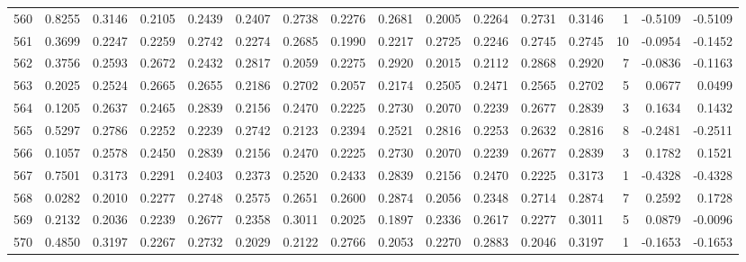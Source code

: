 \begin{tabular}{lrrrrrrrrrrrrrrr}
560 &      0.8255 &  0.3146 &  0.2105 &  0.2439 &  0.2407 &  0.2738 &  0.2276 &  0.2681 &  0.2005 &  0.2264 &   0.2731 &     0.3146 &      1 &                   -0.5109 &                    -0.5109 \\
561 &      0.3699 &  0.2247 &  0.2259 &  0.2742 &  0.2274 &  0.2685 &  0.1990 &  0.2217 &  0.2725 &  0.2246 &   0.2745 &     0.2745 &     10 &                   -0.0954 &                    -0.1452 \\
562 &      0.3756 &  0.2593 &  0.2672 &  0.2432 &  0.2817 &  0.2059 &  0.2275 &  0.2920 &  0.2015 &  0.2112 &   0.2868 &     0.2920 &      7 &                   -0.0836 &                    -0.1163 \\
563 &      0.2025 &  0.2524 &  0.2665 &  0.2655 &  0.2186 &  0.2702 &  0.2057 &  0.2174 &  0.2505 &  0.2471 &   0.2565 &     0.2702 &      5 &                    0.0677 &                     0.0499 \\
564 &      0.1205 &  0.2637 &  0.2465 &  0.2839 &  0.2156 &  0.2470 &  0.2225 &  0.2730 &  0.2070 &  0.2239 &   0.2677 &     0.2839 &      3 &                    0.1634 &                     0.1432 \\
565 &      0.5297 &  0.2786 &  0.2252 &  0.2239 &  0.2742 &  0.2123 &  0.2394 &  0.2521 &  0.2816 &  0.2253 &   0.2632 &     0.2816 &      8 &                   -0.2481 &                    -0.2511 \\
566 &      0.1057 &  0.2578 &  0.2450 &  0.2839 &  0.2156 &  0.2470 &  0.2225 &  0.2730 &  0.2070 &  0.2239 &   0.2677 &     0.2839 &      3 &                    0.1782 &                     0.1521 \\
567 &      0.7501 &  0.3173 &  0.2291 &  0.2403 &  0.2373 &  0.2520 &  0.2433 &  0.2839 &  0.2156 &  0.2470 &   0.2225 &     0.3173 &      1 &                   -0.4328 &                    -0.4328 \\
568 &      0.0282 &  0.2010 &  0.2277 &  0.2748 &  0.2575 &  0.2651 &  0.2600 &  0.2874 &  0.2056 &  0.2348 &   0.2714 &     0.2874 &      7 &                    0.2592 &                     0.1728 \\
569 &      0.2132 &  0.2036 &  0.2239 &  0.2677 &  0.2358 &  0.3011 &  0.2025 &  0.1897 &  0.2336 &  0.2617 &   0.2277 &     0.3011 &      5 &                    0.0879 &                    -0.0096 \\
570 &      0.4850 &  0.3197 &  0.2267 &  0.2732 &  0.2029 &  0.2122 &  0.2766 &  0.2053 &  0.2270 &  0.2883 &   0.2046 &     0.3197 &      1 &                   -0.1653 &                    -0.1653 \\

\end{tabular}
